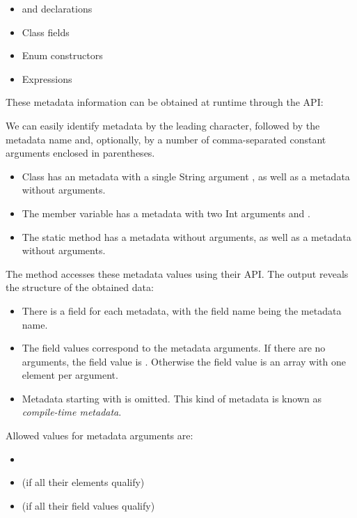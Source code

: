 \begin{itemize}
	\item {} and  declarations
	\item Class fields
	\item Enum constructors
	\item Expressions
\end{itemize}

These metadata information can be obtained at runtime through the  API:


We can easily identify metadata by the leading  character, followed by the metadata name and, optionally, by a number of comma-separated constant arguments enclosed in parentheses.

\begin{itemize}
	\item Class  has an  metadata with a single String argument , as well as a  metadata without arguments.
	\item The member variable  has a  metadata with two Int arguments  and .
	\item The static method  has a  metadata without arguments, as well as a  metadata without arguments.
\end{itemize}

The  method accesses these metadata values using their API. The output reveals the structure of the obtained data:

\begin{itemize}
	\item There is a field for each metadata, with the field name being the metadata name.
	\item The field values correspond to the metadata arguments. If there are no arguments, the field value is . Otherwise the field value is an array with one element per argument.
	\item Metadata starting with \expr{:} is omitted. This kind of metadata is known as \emph{compile-time metadata}.
\end{itemize}

Allowed values for metadata arguments are:

\begin{itemize}
	\item {}
	\item {} (if all their elements qualify)
	\item {} (if all their field values qualify)
\end{itemize}

